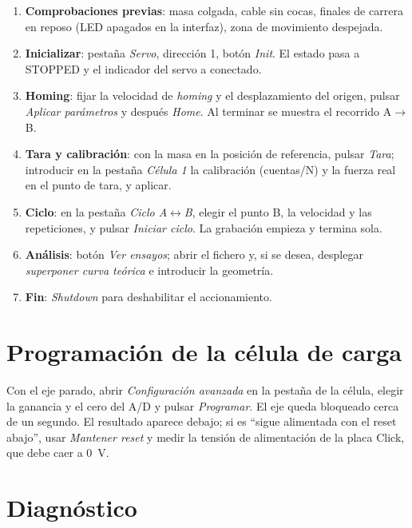 \begin{enumerate}
  \item \textbf{Comprobaciones previas}: masa colgada, cable sin cocas, finales de carrera en reposo
        (LED apagados en la interfaz), zona de movimiento despejada.
  \item \textbf{Inicializar}: pestaña \emph{Servo}, dirección 1, botón \emph{Init}. El estado pasa a
        STOPPED y el indicador del servo a conectado.
  \item \textbf{Homing}: fijar la velocidad de \emph{homing} y el desplazamiento del origen, pulsar
        \emph{Aplicar parámetros} y después \emph{Home}. Al terminar se muestra el recorrido A$\rightarrow$B.
  \item \textbf{Tara y calibración}: con la masa en la posición de referencia, pulsar \emph{Tara};
        introducir en la pestaña \emph{Célula 1} la calibración (cuentas/N) y la fuerza real en el
        punto de tara, y aplicar.
  \item \textbf{Ciclo}: en la pestaña \emph{Ciclo A$\leftrightarrow$B}, elegir el punto B, la velocidad
        y las repeticiones, y pulsar \emph{Iniciar ciclo}. La grabación empieza y termina sola.
  \item \textbf{Análisis}: botón \emph{Ver ensayos}; abrir el fichero y, si se desea, desplegar
        \emph{superponer curva teórica} e introducir la geometría.
  \item \textbf{Fin}: \emph{Shutdown} para deshabilitar el accionamiento.
\end{enumerate}

\section{Programación de la célula de carga}

Con el eje parado, abrir \emph{Configuración avanzada} en la pestaña de la célula, elegir la ganancia y
el cero del A/D y pulsar \emph{Programar}. El eje queda bloqueado cerca de un segundo. El resultado
aparece debajo; si es ``sigue alimentada con el reset abajo'', usar \emph{Mantener reset} y medir la
tensión de alimentación de la placa Click, que debe caer a \SI{0}{\volt}.

\section{Diagnóstico}

